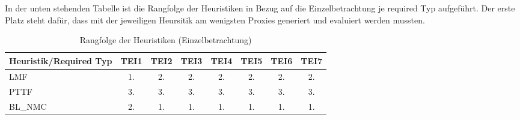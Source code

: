 \\\\
In der unten stehenden Tabelle ist die Rangfolge der Heuristiken in Bezug auf die Einzelbetrachtung je required Typ aufgeführt. Der erste Platz steht dafür, dass mit der jeweiligen Heursitik am wenigsten Proxies generiert und evaluiert werden mussten.
\begin{table}[!h]
\centering
\begin{tabular}{|l|c|c|c|c|c|c|c|}
\hline
\hline
\textbf{Heuristik/Required Typ} & \textbf{TEI1} & \textbf{TEI2}& \textbf{TEI3}& \textbf{TEI4}& \textbf{TEI5}& \textbf{TEI6}& \textbf{TEI7}\\
\hline
\hline
LMF  &1.&2.&2.&2.&2.&2.&2.\\
\hline
PTTF  &3. &3.&3.&3.&3.&3.&3. \\
\hline
BL\_NMC & 2. &1. &1. &1. &1.&1.&1.\\
\hline
\hline
\end{tabular}
\caption{Rangfolge der Heuristiken (Einzelbetrachtung)}
\end{table}
